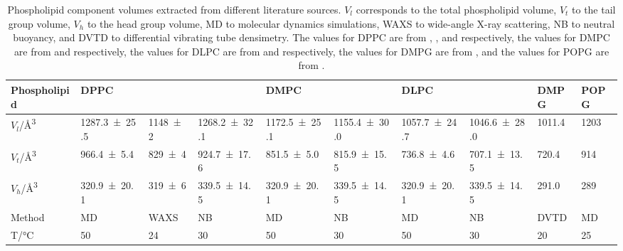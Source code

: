 \begin{sidewaystable}
    \centering
    \small
    \caption{Phospholipid component volumes extracted from different literature sources. $V_l$ corresponds to the total phospholipid volume, $V_t$ to the tail group volume, $V_h$ to the head group volume, MD to molecular dynamics simulations, WAXS to wide-angle X-ray scattering, NB to neutral buoyancy, and DVTD to differential vibrating tube densimetry. The values for DPPC are from \cite{armen_phospholipid_1998}, \cite{sun_order_1994}, and \cite{kucerka_determination_2004,balgavy_evaluation_2001} respectively, the values for DMPC are from \cite{armen_phospholipid_1998} and \cite{kucerka_determination_2004,balgavy_evaluation_2001} respectively, the values for DLPC are from \cite{armen_phospholipid_1998} and \cite{kucerka_determination_2004,balgavy_evaluation_2001} respectively, the values for DMPG are from \cite{pan_molecular_2012}, and the values for POPG are from \cite{kucerka_scattering_2012}.}
    \label{tab:water}
    \begin{tabular}{l | l l l | l l | l l | l | l}
        \toprule
        Phospholipid & \multicolumn{3}{l|}{DPPC} & \multicolumn{2}{|l|}{DMPC} & \multicolumn{2}{|l|}{DLPC} & DMPG & POPG \\
    \midrule
    $V_l$/\si{\angstrom\cubed} & \num{1287.3 \pm 25.5} & \num{1148 \pm 2} & \num{1268.2 \pm 32.1} & \num{1172.5 \pm 25.1} & \num{1155.4 \pm 30.0} & \num{1057.7 \pm 24.7} & \num{1046.6 \pm 28.0} & \num{1011.4} & \num{1203} \\
    $V_t$/\si{\angstrom\cubed} & \num{966.4 \pm 5.4} & \num{829 \pm 4} & \num{924.7 \pm 17.6} & \num{851.5 \pm 5.0} & \num{815.9 \pm 15.5} & \num{736.8 \pm 4.6} & \num{707.1 \pm 13.5} & \num{720.4} & \num{914} \\
    $V_h$/\si{\angstrom\cubed} & \num{320.9 \pm 20.1} & \num{319 \pm 6} & \num{339.5 \pm 14.5} & \num{320.9 \pm 20.1} & \num{339.5 \pm 14.5} & \num{320.9 \pm 20.1} & \num{339.5 \pm 14.5} & \num{291.0} & \num{289} \\
    \midrule
    Method & MD & WAXS & NB & MD & NB & MD & NB & DVTD & MD \\
    T/\si{\celsius}& 50 & 24 & 30 & 50 & 30 & 50 & 30 & 20 & 25 \\
        \bottomrule
    \end{tabular}
\end{sidewaystable}
%

